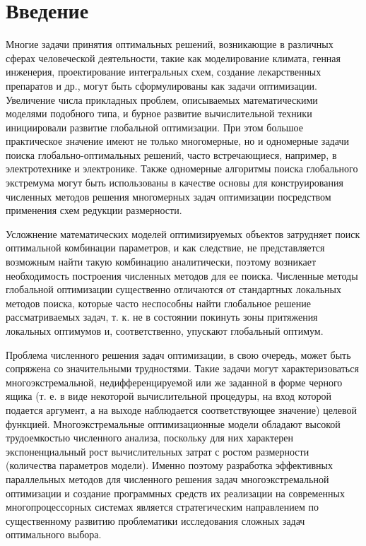 \documentclass{report}
\begin{document}
\setcounter{page}{2}

\setlength{\parindent}{5ex}


\tableofcontents
\newpage

\section*{Введение}
Многие задачи принятия оптимальных решений, возникающие в различных сферах человеческой деятельности, такие как моделирование климата, генная инженерия, проектирование интегральных схем, создание лекарственных препаратов и др., могут быть сформулированы как задачи оптимизации. Увеличение числа прикладных проблем, описываемых математическими моделями подобного типа, и бурное развитие вычислительной техники инициировали развитие глобальной оптимизации. При этом большое практическое значение имеют не только многомерные, но и одномерные задачи поиска глобально-оптимальных решений, часто встречающиеся, например, в электротехнике и электронике. Также одномерные алгоритмы поиска глобального экстремума могут быть использованы в качестве основы для конструирования численных методов решения многомерных задач оптимизации посредством применения схем редукции размерности.

Усложнение математических моделей оптимизируемых объектов затрудняет поиск оптимальной комбинации параметров, и как следствие, не представляется возможным найти такую комбинацию аналитически, поэтому возникает необходимость построения численных методов для ее поиска. Численные методы глобальной оптимизации существенно отличаются от стандартных локальных методов поиска, которые часто неспособны найти глобальное решение рассматриваемых задач, т. к. не в состоянии покинуть зоны притяжения локальных оптимумов и, соответственно, упускают глобальный оптимум.

Проблема численного решения задач оптимизации, в свою очередь, может быть сопряжена со значительными трудностями. Такие задачи могут характеризоваться многоэкстремальной, недифференцируемой или же заданной в форме черного ящика (т. е. в виде некоторой вычислительной процедуры, на вход которой подается аргумент, а на выходе наблюдается соответствующее значение) целевой функцией. Многоэкстремальные оптимизационные модели обладают высокой трудоемкостью численного анализа, поскольку для них характерен экспоненциальный рост вычислительных затрат с ростом размерности (количества параметров модели).  Именно поэтому разработка эффективных параллельных методов для численного решения задач многоэкстремальной оптимизации и создание программных средств их реализации на современных многопроцессорных системах является стратегическим направлением по существенному развитию проблематики исследования сложных задач оптимального выбора.
\end{document}
